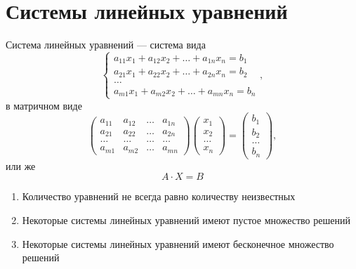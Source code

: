 \documentclass[12pt, a4paper]{article}
\begin{document}
    \section{Системы линейных уравнений}
    \begin{definition}
        Система линейных уравнений --- система вида \[
            \begin{cases}
                a_{11}x_{1} + a_{12}x_{2} + \ldots + a_{1n}x_{n} = b_{1} \\
                a_{21}x_{1} + a_{22}x_{2} + \ldots + a_{2n}x_{n} = b_{2} \\
                \ldots \\
                a_{m 1}x_{1} + a_{m 2}x_{2} + \ldots  + a_{mn}x_{n} = b_{n}
            \end{cases},
        \] в матричном виде
        \[
            \begin{pmatrix}
                a_{11} & a_{12} & \ldots & a_{1n} \\
                a_{21} & a_{22} & \ldots & a_{2n} \\
                \ldots & \ldots & \ldots & \ldots \\
                a_{m 1}& a_{m 2}& \ldots & a_{mn}
                \end{pmatrix} \begin{pmatrix} x_{1} \\ x_{2} \\ \ldots \\ x_{n} \end{pmatrix} = \begin{pmatrix} b_{1} \\ b_{2} \\ \ldots \\ b_{n} \end{pmatrix},
        \] или же
        \[
            A \cdot X = B
        \] 
    \end{definition}
    \begin{rem}
        \begin{enumerate}
            \item Количество уравнений не всегда равно количеству неизвестных
            \item Некоторые системы линейных уравнений имеют пустое множество решений
            \item Некоторые системы линейных уравнений имеют бесконечное множество решений
        \end{enumerate}
    \end{rem}
\end{document}
